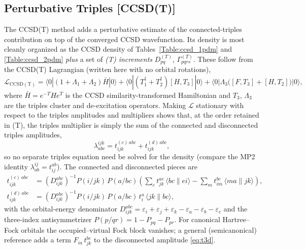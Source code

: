 \documentclass[12pt]{article}
\begin{document}
\subsection{Perturbative Triples [CCSD(T)]}
\label{sec:ccsdt_pdms}

The CCSD(T) method adds a perturbative estimate of the connected-triples
contribution on top of the converged CCSD wavefunction.  Its density is most
cleanly organized as the CCSD density of Tables~\ref{Table:ccsd_1pdm} and
\ref{Table:ccsd_2pdm} \emph{plus} a set of {\em (T) increments}
$D^{(T)}_{pq}$, $\Gamma^{(T)}_{pqrs}$.  These follow from the CCSD(T) Lagrangian
(written here with no orbital rotations),
\begin{equation}
\mathcal{L}_{\mathrm{CCSD(T)}}
  = \langle 0|(1+\Lambda_1+\Lambda_2)\bar{H}|0\rangle
  + \langle 0|(T_1^{\dagger}+T_2^{\dagger})[H,T_3]|0\rangle
  + \langle 0|\Lambda_3\big([F,T_3]+[H,T_2]\big)|0\rangle,
\label{eq:ccsdt_lag}
\end{equation}
where $\bar{H}=e^{-T}He^{T}$ is the CCSD similarity-transformed Hamiltonian and
$T_3$, $\Lambda_3$ are the triples cluster and de-excitation operators.  Making
$\mathcal{L}$ stationary with respect to the triples amplitudes and multipliers
shows that, at the order retained in (T), the triples multiplier is simply the
sum of the connected and disconnected triples amplitudes,
\begin{equation}
\lambda^{ijk}_{abc} = t^{(c)\,abc}_{ijk} + t^{(d)\,abc}_{ijk},
\label{eq:lam3}
\end{equation}
so no separate triples equation need be solved for the density (compare the MP2
identity $\lambda^{ij}_{ab}=t^{ab}_{ij}$).  The connected and disconnected pieces
are
\begin{align}
t^{(c)\,abc}_{ijk} &= \left(D^{abc}_{ijk}\right)^{-1} P(i/jk)\,P(a/bc)
   \left( \sum_e t^{ae}_{jk}\,\langle bc\|ei\rangle
        - \sum_m t^{bc}_{im}\,\langle ma\|jk\rangle \right),
\label{eq:t3c}\\[3pt]
t^{(d)\,abc}_{ijk} &= \left(D^{abc}_{ijk}\right)^{-1} P(i/jk)\,P(a/bc)\,
   t^a_i\,\langle jk\|bc\rangle,
\label{eq:t3d}
\end{align}
with the orbital-energy denominator $D^{abc}_{ijk}=\varepsilon_i+\varepsilon_j
+\varepsilon_k-\varepsilon_a-\varepsilon_b-\varepsilon_c$ and the three-index
antisymmetrizer $P(p/qr)=1-P_{pq}-P_{pr}$.  For canonical Hartree--Fock orbitals
the occupied--virtual Fock block vanishes; a general (semicanonical) reference
adds a term $F_{ia}\,t^{bc}_{jk}$ to the disconnected amplitude \eqref{eq:t3d}.
\end{document}
